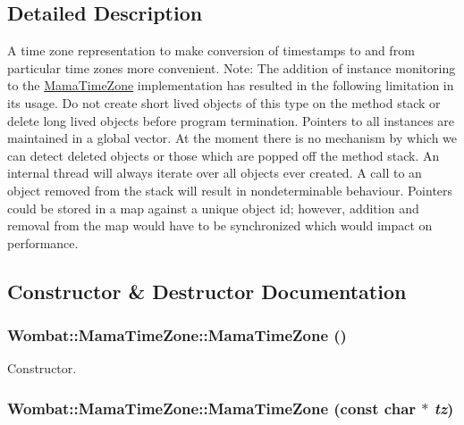 \subsection{Detailed Description}
A time zone representation to make conversion of timestamps to and from particular time zones more convenient. Note: The addition of instance monitoring to the \hyperlink{classWombat_1_1MamaTimeZone}{MamaTimeZone} implementation has resulted in the following limitation in its usage. Do not create short lived objects of this type on the method stack or delete long lived objects before program termination. Pointers to all instances are maintained in a global vector. At the moment there is no mechanism by which we can detect deleted objects or those which are popped off the method stack. An internal thread will always iterate over all objects ever created. A call to an object removed from the stack will result in nondeterminable behaviour. Pointers could be stored in a map against a unique object id; however, addition and removal from the map would have to be synchronized which would impact on performance. 

\subsection{Constructor \& Destructor Documentation}
\hypertarget{classWombat_1_1MamaTimeZone_a3987db671f0f4934c7399cbb5f69466f}{
\subsubsection[{MamaTimeZone}]{\setlength{\rightskip}{0pt plus 5cm}Wombat::MamaTimeZone::MamaTimeZone ()}}
\label{classWombat_1_1MamaTimeZone_a3987db671f0f4934c7399cbb5f69466f}


Constructor. \hypertarget{classWombat_1_1MamaTimeZone_a02ac0801fcc3f4e7684b7c365e38f551}{
\subsubsection[{MamaTimeZone}]{\setlength{\rightskip}{0pt plus 5cm}Wombat::MamaTimeZone::MamaTimeZone (const char $\ast$ {\em tz})}}
\label{classWombat_1_1MamaTimeZone_a02ac0801fcc3f4e7684b7c365e38f551}


